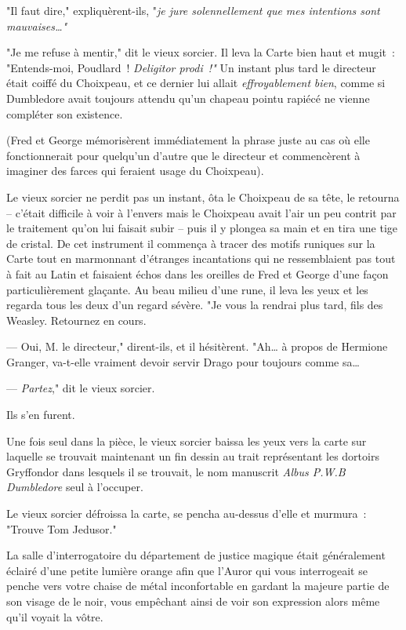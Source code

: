 "Il faut dire," expliquèrent-ils, "\emph{je jure solennellement que mes intentions sont mauvaises…"}

"Je me refuse à mentir," dit le vieux sorcier. Il leva la Carte bien haut et mugit~: "Entends-moi, Poudlard~! \emph{Deligitor prodi~!"} Un instant plus tard le directeur était coiffé du Choixpeau, et ce dernier lui allait \emph{effroyablement} \emph{bien}, comme si Dumbledore avait toujours attendu qu'un chapeau pointu rapiécé ne vienne compléter son existence.

(Fred et George mémorisèrent immédiatement la phrase juste au cas où elle fonctionnerait pour quelqu'un d'autre que le directeur et commencèrent à imaginer des farces qui feraient usage du Choixpeau).

Le vieux sorcier ne perdit pas un instant, ôta le Choixpeau de sa tête, le retourna -- c'était difficile à voir à l'envers mais le Choixpeau avait l'air un peu contrit par le traitement qu'on lui faisait subir -- puis il y plongea sa main et en tira une tige de cristal. De cet instrument il commença à tracer des motifs runiques sur la Carte tout en marmonnant d'étranges incantations qui ne ressemblaient pas tout à fait au Latin et faisaient échos dans les oreilles de Fred et George d'une façon particulièrement glaçante. Au beau milieu d'une rune, il leva les yeux et les regarda tous les deux d'un regard sévère. "Je vous la rendrai plus tard, fils des Weasley. Retournez en cours.

--- Oui, M. le directeur," dirent-ils, et il hésitèrent. "Ah… à propos de Hermione Granger, va-t-elle vraiment devoir servir Drago pour toujours comme sa…

--- \emph{Partez}," dit le vieux sorcier.

Ils s'en furent.

Une fois seul dans la pièce, le vieux sorcier baissa les yeux vers la carte sur laquelle se trouvait maintenant un fin dessin au trait représentant les dortoirs Gryffondor dans lesquels il se trouvait, le nom manuscrit \emph{Albus P.W.B Dumbledore} seul à l'occuper.

Le vieux sorcier défroissa la carte, se pencha au-dessus d'elle et murmura~: "Trouve Tom Jedusor."

\later

La salle d'interrogatoire du département de justice magique était généralement éclairé d'une petite lumière orange afin que l'Auror qui vous interrogeait se penche vers votre chaise de métal inconfortable en gardant la majeure partie de son visage de le noir, vous empêchant ainsi de voir son expression alors même qu'il voyait la vôtre.

